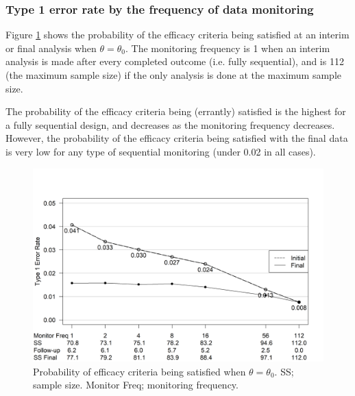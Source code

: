 \documentclass[12pt]{article}
\begin{document}
\subsubsection{Type 1 error rate by the frequency of data monitoring}
Figure \ref{fig:ex1t1e} shows the probability of the efficacy criteria being satisfied at an interim or final analysis when $\theta=\theta_0$. The monitoring frequency is 1 when an interim analysis is made after every completed outcome (i.e. fully sequential), and is 112 (the maximum sample size) if the only analysis is done at the maximum sample size. 

The probability of the efficacy criteria being (errantly) satisfied is the highest for a fully sequential design, and decreases as the monitoring frequency decreases. However, the probability of the efficacy criteria being satisfied with the final data is very low for any type of sequential monitoring (under 0.02 in all cases).
\begin{figure}\begin{center}

    \includegraphics[width=6in]{./FIGURES/figure4.png}
    \caption{Probability of efficacy criteria being satisfied when $\theta=\theta_0$. SS; sample size. Monitor Freq; monitoring frequency.}
	\label{fig:ex1t1e}

 
\end{center}\end{figure}
\end{document}
